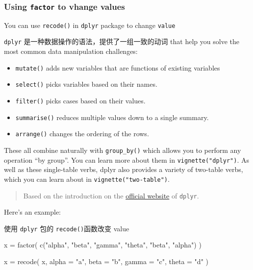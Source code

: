 \documentclass[
]{article}
\newenvironment{Shaded}{}{}
\newcommand{\AttributeTok}[1]{\textcolor[rgb]{0.49,0.56,0.16}{#1}}
\newcommand{\FunctionTok}[1]{\textcolor[rgb]{0.02,0.16,0.49}{#1}}
\newcommand{\NormalTok}[1]{#1}
\newcommand{\OtherTok}[1]{\textcolor[rgb]{0.00,0.44,0.13}{#1}}
\newcommand{\StringTok}[1]{\textcolor[rgb]{0.25,0.44,0.63}{#1}}
\begin{document}
\hypertarget{using-factor-to-vhange-values}{%
\subsubsection{\texorpdfstring{Using \texttt{factor} to vhange
values}{Using factor to vhange values}}\label{using-factor-to-vhange-values}}

You can use \texttt{recode()} in \texttt{dplyr} package to change
\texttt{value}

\texttt{dplyr} 是一种数据操作的语法，提供了一组一致的动词 that help you
solve the most common data manipulation challenges:

\begin{itemize}
\item
  \texttt{mutate()} adds new variables that are functions of existing
  variables
\item
  \texttt{select()} picks variables based on their names.
\item
  \texttt{filter()} picks cases based on their values.
\item
  \texttt{summarise()} reduces multiple values down to a single summary.
\item
  \texttt{arrange()} changes the ordering of the rows.
\end{itemize}

These all combine naturally with \texttt{group\_by()} which allows you
to perform any operation ``by group''. You can learn more about them in
\texttt{vignette("dplyr")}. As well as these single-table verbs, dplyr
also provides a variety of two-table verbs, which you can learn about in
\texttt{vignette("two-table")}.

\begin{quote}
Based on the introduction on the
\href{https://dplyr.tidyverse.org}{official website} of \texttt{dplyr}.
\end{quote}

Here's an example:

使用 \texttt{dplyr} 包的 \texttt{recode()}函数改变 value

\begin{Shaded}
\begin{Highlighting}[]
\NormalTok{x }\OtherTok{=}
  \FunctionTok{factor}\NormalTok{(}
    \FunctionTok{c}\NormalTok{(}\StringTok{"alpha"}\NormalTok{, }\StringTok{"beta"}\NormalTok{, }\StringTok{"gamma"}\NormalTok{, }\StringTok{"theta"}\NormalTok{, }\StringTok{"beta"}\NormalTok{, }\StringTok{"alpha"}\NormalTok{)}
\NormalTok{  )}

\NormalTok{x }\OtherTok{=}
  \FunctionTok{recode}\NormalTok{(}
\NormalTok{    x,}
    \AttributeTok{alpha =} \StringTok{"a"}\NormalTok{,}
    \AttributeTok{beta =} \StringTok{"b"}\NormalTok{,}
    \AttributeTok{gamma =} \StringTok{"c"}\NormalTok{,}
    \AttributeTok{theta =} \StringTok{"d"}
\NormalTok{  )}
\end{Highlighting}
\end{Shaded}
\end{document}
